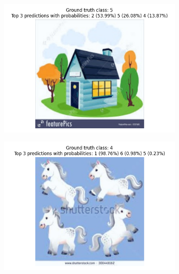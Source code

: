 \documentclass[a4paper,11pt]{article}
\begin{document}
\begin{figure}[ht]
    \centering
    \begin{subfigure}[b]{0.45\textwidth}
        \includegraphics[width=\textwidth]{../out/few_shot_full_model/error_1.png}
    \end{subfigure}
    \hfill
    \begin{subfigure}[b]{0.45\textwidth}
        \includegraphics[width=\textwidth]{../out/few_shot_full_model/error_2.png}
    \end{subfigure}
    \begin{subfigure}[b]{0.45\textwidth}

\end{subfigure}
\end{figure}
\end{document}
